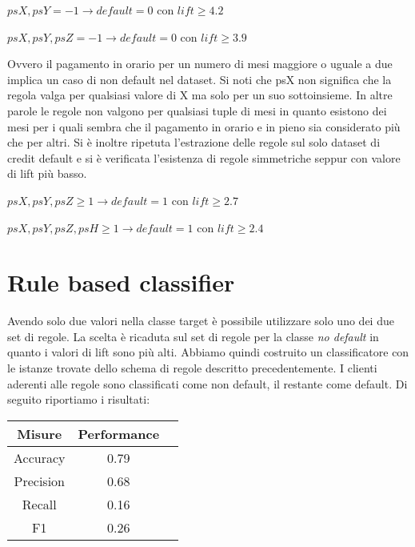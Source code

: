\begin{center}
	$psX, psY = -1 \rightarrow default=0$ con $lift \geq 4.2$
	
	$psX, psY, psZ = -1 \rightarrow default=0$ con $lift \geq 3.9$
\end{center}

Ovvero il pagamento in orario per un numero di mesi maggiore o uguale a due
implica un caso di non default nel dataset. Si noti che psX non significa
che la regola valga per qualsiasi valore di X ma solo per un suo sottoinsieme.
In altre parole le regole non valgono per qualsiasi tuple di mesi in quanto
esistono dei mesi per i quali sembra che il pagamento in orario e in pieno
sia considerato pi\`u che per altri. Si \`e inoltre ripetuta l'estrazione
delle regole sul solo dataset di credit default e si \`e verificata l'esistenza
di regole simmetriche seppur con valore di lift pi\`u basso.

\begin{center}
	$psX, psY, psZ \geq 1 \rightarrow default=1$ con $lift \geq 2.7$
	
	$psX, psY, psZ, psH \geq 1 \rightarrow default=1$ con $lift \geq 2.4$
\end{center}

\section{Rule based classifier}
Avendo solo due valori nella classe target \`e possibile utilizzare solo uno dei
due set di regole. La scelta \`e ricaduta sul set di regole per la classe 
\textit{no default} in quanto i valori di lift sono pi\`u alti.
Abbiamo quindi costruito un classificatore con le istanze trovate dello schema di
regole descritto precedentemente. I clienti aderenti alle regole sono classificati
come non default, il restante come default. Di seguito riportiamo i risultati:

\begin{center}
	\begin{tabular}{c|c|c}
		\hline
		\textbf{Misure} & \textbf{Performance}\\
		\hline
		Accuracy & 0.79\\
		\hline
		Precision & 0.68\\
		\hline
		Recall & 0.16\\
		\hline
		F1 & 0.26\\
		\hline
	\end{tabular}
\end{center}

